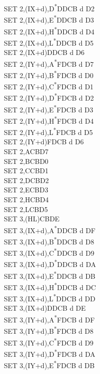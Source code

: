 \documentclass[twoside,openright,a4paper]{book}
\begin{document}
\begin{multicols}{3}
{\begin{tabbing}
	SET 2,(IX+d),D\textsuperscript{*}\>DDCB d D2\\
	SET 2,(IX+d),E\textsuperscript{*}\>DDCB d D3\\
	SET 2,(IX+d),H\textsuperscript{*}\>DDCB d D4\\
	SET 2,(IX+d),L\textsuperscript{*}\>DDCB d D5\\
	SET 2,(IX+d)\>DDCB d D6\\
	SET 2,(IY+d),A\textsuperscript{*}\>FDCB d D7\\
	SET 2,(IY+d),B\textsuperscript{*}\>FDCB d D0\\
	SET 2,(IY+d),C\textsuperscript{*}\>FDCB d D1\\
	SET 2,(IY+d),D\textsuperscript{*}\>FDCB d D2\\
	SET 2,(IY+d),E\textsuperscript{*}\>FDCB d D3\\
	SET 2,(IY+d),H\textsuperscript{*}\>FDCB d D4\\
	SET 2,(IY+d),L\textsuperscript{*}\>FDCB d D5\\
	SET 2,(IY+d)\>FDCB d D6\\
	SET 2,A\>CBD7\\
	SET 2,B\>CBD0\\
	SET 2,C\>CBD1\\
	SET 2,D\>CBD2\\
	SET 2,E\>CBD3\\
	SET 2,H\>CBD4\\
	SET 2,L\>CBD5\\
	SET 3,(HL)\>CBDE\\
	SET 3,(IX+d),A\textsuperscript{*}\>DDCB d DF\\
	SET 3,(IX+d),B\textsuperscript{*}\>DDCB d D8\\
	SET 3,(IX+d),C\textsuperscript{*}\>DDCB d D9\\
	SET 3,(IX+d),D\textsuperscript{*}\>DDCB d DA\\
	SET 3,(IX+d),E\textsuperscript{*}\>DDCB d DB\\
	SET 3,(IX+d),H\textsuperscript{*}\>DDCB d DC\\
	SET 3,(IX+d),L\textsuperscript{*}\>DDCB d DD\\
	SET 3,(IX+d)\>DDCB d DE\\
	SET 3,(IY+d),A\textsuperscript{*}\>FDCB d DF\\
	SET 3,(IY+d),B\textsuperscript{*}\>FDCB d D8\\
	SET 3,(IY+d),C\textsuperscript{*}\>FDCB d D9\\
	SET 3,(IY+d),D\textsuperscript{*}\>FDCB d DA\\
	SET 3,(IY+d),E\textsuperscript{*}\>FDCB d DB\\

\end{tabbing}}
\end{multicols}
\end{document}
